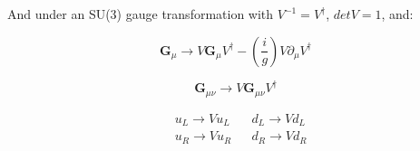 \documentclass[12pt,a4paper,pagesize=pdftex]{scrartcl}
\begin{document}
And under an SU(3) gauge transformation with $V^{-1}=V^\dagger$, $detV=1$, and:

\begin{equation*}
	\mathbf{G}_\mu\rightarrow V\mathbf{G}_\mu V^\dagger - \left(\frac{i}{g}\right)V\partial_\mu V^\dagger
\end{equation*}

\begin{equation*}
	\mathbf{G}_{\mu\nu}\rightarrow V\mathbf{G}_{\mu\nu}V^\dagger
\end{equation*}

\begin{align*}
	&u_L \rightarrow V u_L && d_L \rightarrow V d_L \\
	&u_R \rightarrow V u_R && d_R \rightarrow V d_R
\end{align*}
\end{document}
